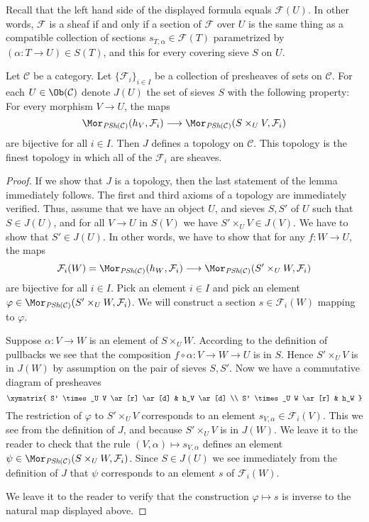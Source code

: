 \noindent
Recall that the left hand side of the displayed
formula equals $\mathcal{F}(U)$. In other words, $\mathcal{F}$
is a sheaf if and only if a section of $\mathcal{F}$
over $U$ is the same thing as a compatible collection of sections
$s_{T, \alpha} \in \mathcal{F}(T)$ parametrized by
$(\alpha : T \to U) \in S(T)$, and this for every covering sieve $S$
on $U$.

\begin{lemma}
\label{lemma-topology-presheaves-sheaves}
Let $\mathcal{C}$ be a category. Let $\{ \mathcal{F}_i \}_{i\in I}$ be a
collection of presheaves of sets on $\mathcal{C}$. For each
$U \in \Ob(\mathcal{C})$ denote
$J(U)$ the set of sieves $S$ with the following property:
For every morphism $V \to U$, the maps
$$
\Mor_{\textit{PSh}(\mathcal{C})}(h_V, \mathcal{F}_i)
\longrightarrow
\Mor_{\textit{PSh}(\mathcal{C})}(S \times_U V, \mathcal{F}_i)
$$
are bijective for all $i \in I$. Then $J$ defines a
topology on $\mathcal{C}$. This topology is the finest
topology in which all of the $\mathcal{F}_i$ are sheaves.
\end{lemma}

\begin{proof}
If we show that $J$ is a topology, then the last statement of
the lemma immediately follows. The first and third axioms of
a topology are immediately verified. Thus, assume that
we have an object $U$, and sieves $S, S'$ of $U$
such that $S \in J(U)$, and for all $V \to U$ in $S(V)$
we have $S' \times_U V \in J(V)$. We have to show that
$S' \in J(U)$. In other words, we have to show that for
any $f : W \to U$, the maps
$$
\mathcal{F}_i(W) =
\Mor_{\textit{PSh}(\mathcal{C})}(h_W, \mathcal{F}_i)
\longrightarrow
\Mor_{\textit{PSh}(\mathcal{C})}(S' \times_U W, \mathcal{F}_i)
$$
are bijective for all $i \in I$. Pick an element
$i \in I$ and pick an element
$\varphi \in
\Mor_{\textit{PSh}(\mathcal{C})}(S' \times_U W, \mathcal{F}_i)$.
We will construct a section $s \in \mathcal{F}_i(W)$
mapping to $\varphi$.

\medskip\noindent
Suppose $\alpha : V \to W$ is an element of $S \times_U W$.
According to the definition of pullbacks we see that
the composition $f \circ\alpha : V \to W  \to U$ is in $S$. Hence
$S' \times_U V$ is in $J(W)$ by assumption on the pair
of sieves $S, S'$. Now we have a commutative diagram
of presheaves
$$
\xymatrix{
S' \times_U V \ar[r] \ar[d] & h_V \ar[d] \\
S' \times_U W \ar[r] & h_W
}
$$
The restriction of $\varphi$ to $S' \times_U V$
corresponds to an element $s_{V, \alpha} \in \mathcal{F}_i(V)$.
This we see from the definition of $J$,
and because $S' \times_U V$ is in $J(W)$.
We leave it to the reader to check
that the rule $(V, \alpha) \mapsto s_{V, \alpha}$ defines
an element
$\psi \in
\Mor_{\textit{PSh}(\mathcal{C})}(S \times_U W, \mathcal{F}_i)$.
Since $S \in J(U)$ we see immediately from the definition of $J$
that $\psi$ corresponds to an element $s$ of $\mathcal{F}_i(W)$.

\medskip\noindent
We leave it to the reader to verify that the construction
$\varphi \mapsto s$ is inverse to the natural map displayed above.
\end{proof}

